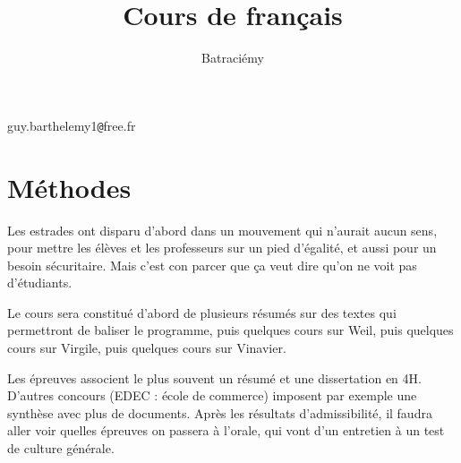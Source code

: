 \documentclass[a4paper,12pt]{book}
\title{Cours de français}
\author{Batraciémy}
\begin{document}
guy.barthelemy1\texttt{@}free.fr
\tableofcontents

\chapter{Méthodes}
\par Les estrades ont disparu d'abord dans un mouvement qui n'aurait aucun sens, pour mettre les élèves et les professeurs sur un pied d'égalité, et aussi pour un besoin sécuritaire. Mais c'est con parcer que ça veut dire qu'on ne voit pas d'étudiants.
\par Le cours sera constitué d'abord de plusieurs résumés sur des textes qui permettront de baliser le programme, puis quelques cours sur Weil, puis quelques cours sur Virgile, puis quelques cours sur Vinavier.
\par Les épreuves associent le plus souvent un résumé et une dissertation en 4H. D'autres concours (EDEC : école de commerce) imposent par exemple une synthèse avec plus de documents. Après les résultats d'admissibilité, il faudra aller voir quelles épreuves on passera à l'orale, qui vont d'un entretien à un test de culture générale.
\end{document}
